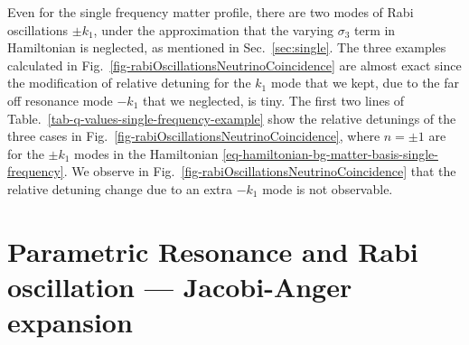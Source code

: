 \documentclass[%
reprint,
 amsmath,amssymb,
 prd,
]{revtex4-1}
\begin{document}
Even for the single frequency matter profile, there are two modes of Rabi oscillations $\pm k_1$, under the approximation that the varying $\sigma_3$ term in Hamiltonian is neglected, as mentioned in Sec.~\ref{sec:single}. The three examples calculated in Fig.~\ref{fig-rabiOscillationsNeutrinoCoincidence} are almost exact since the modification of relative detuning for the $k_1$ mode that we kept, due to the far off resonance mode $-k_1$ that we neglected, is tiny. The first two lines of Table.~\ref{tab-q-values-single-frequency-example} show the relative detunings of the three cases in Fig.~\ref{fig-rabiOscillationsNeutrinoCoincidence}, where $n=\pm 1$ are for the $\pm k_1$ modes in the Hamiltonian \ref{eq-hamiltonian-bg-matter-basis-single-frequency}. We observe in Fig.~\ref{fig-rabiOscillationsNeutrinoCoincidence} that the relative detuning change due to an extra $-k_1$ mode is not observable.




\section{\label{sec:jacobi}Parametric Resonance and Rabi oscillation --- Jacobi-Anger expansion}
\end{document}

